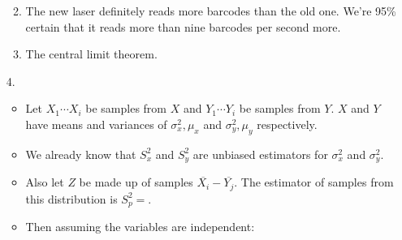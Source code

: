\documentclass{article}
\begin{document}
\begin{enumerate}
\begin{enumerate}
\begin{equation*}
            \end{equation*}
        \item The new laser definitely reads more barcodes than the old one. We're 95\% certain that it reads more than nine barcodes per second more.
        \item The central limit theorem.
    \end{enumerate}
\item [4.]
    \begin{itemize}
    \item Let $X_1 \cdots X_i$ be samples from $X$ and $Y_1 \cdots Y_i$ be samples from $Y$. $X$ and $Y$ have means and variances of $\sigma_x^2, \mu_x$ and $\sigma_y^2, \mu_y$ respectively.
    \item We already know that $S_x^2$ and $S_y^2$ are unbiased estimators for $\sigma_x^2$ and $\sigma_y^2$.
    \item Also let $Z$ be made up of samples $\overbar{X_i} - \overbar{Y_j}$. The estimator of samples from this distribution is $S_p^2 = $.
    \item Then assuming the variables are independent:


\end{itemize}
\end{enumerate}
\end{document}
